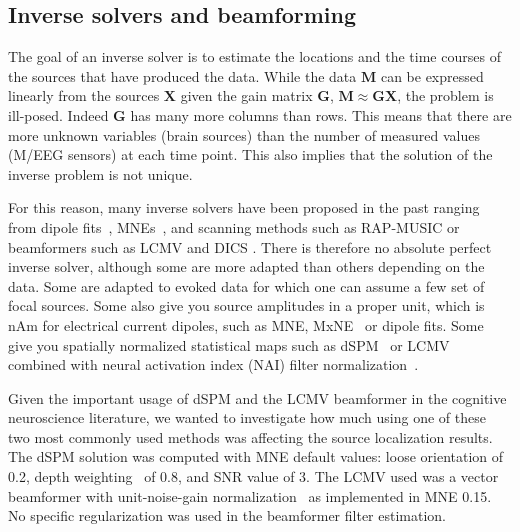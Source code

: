 \subsection{Inverse solvers and beamforming}

The goal of an inverse solver is to estimate the locations and the time courses of the sources that have produced the data. While the data $\mathbf{M}$ can be expressed linearly from the sources $\mathbf{X}$ given the gain matrix $\mathbf{G}$, $\mathbf{M} \approx \mathbf{GX}$, the problem is ill-posed. Indeed $\mathbf{G}$ has many more columns than rows. This means that there are more unknown variables (brain sources) than the number of measured values (M/EEG sensors) at each time point. This also implies that the solution of the inverse problem is not unique.

For this reason, many inverse solvers have been proposed in the past ranging from dipole fits~\citep{scherg-etal:85,mosher-lewis-etal92}, \acp{MNE}~\citep{Hamalainen:1984}, and scanning methods such as RAP-MUSIC or beamformers such as LCMV and DICS \citep{Van_Veen:1997,gross-etal:2001,Sekihara:2005}. There is therefore no absolute perfect inverse solver, although some are more adapted than others depending on the data. Some are adapted to evoked data for which one can assume a few set of focal sources. Some also give you source amplitudes in a proper unit, which is nAm for electrical current dipoles, such as MNE, MxNE~\cite{gramfort-etal:2013} or dipole fits. Some give you spatially normalized statistical maps such as dSPM~\citep{dale2000dspm} or LCMV combined with neural activation index (NAI) filter normalization~\citep{Van_Veen:1997}.

Given the important usage of dSPM and the LCMV beamformer in the cognitive neuroscience literature, we wanted to investigate how much using one of these two most commonly used methods was affecting the source localization results. The dSPM solution was computed with MNE default values: loose orientation of 0.2, depth weighting~\citep{lin2006assessing} of 0.8, and SNR value of 3. The LCMV used was a vector beamformer with unit-noise-gain normalization~\citep{Sekihara:2005} as implemented in MNE 0.15. No specific regularization was used in the beamformer filter estimation.

